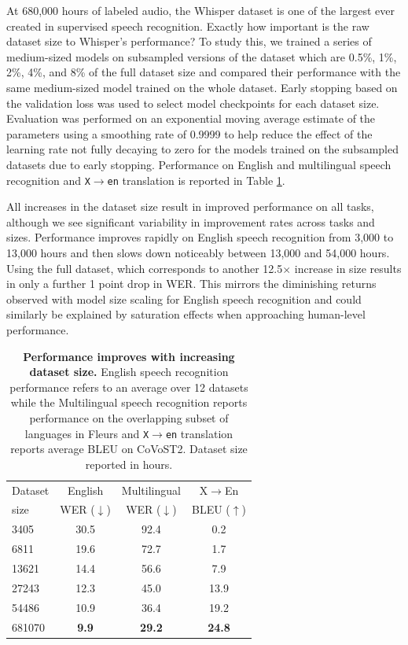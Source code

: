 \documentclass[nohyperref]{article}
\theoremstyle{plain}
\theoremstyle{definition}
\theoremstyle{remark}
\begin{document}
At 680,000 hours of labeled audio, the Whisper dataset is one of the largest ever created in supervised speech recognition. Exactly how important is the raw dataset size to Whisper's performance? To study this, we trained a series of medium-sized models on subsampled versions of the dataset which are 0.5\%, 1\%, 2\%, 4\%, and 8\% of the full dataset size and compared their performance with the same medium-sized model trained on the whole dataset. Early stopping based on the validation loss was used to select model checkpoints for each dataset size. Evaluation was performed on an exponential moving average estimate of the parameters \cite{polyak1992acceleration} using a smoothing rate of 0.9999 to help reduce the effect of the learning rate not fully decaying to zero for the models trained on the subsampled datasets due to early stopping. Performance on English and multilingual speech recognition and \texttt{X$\rightarrow$en} translation is reported in Table \ref{dataset_scaling_table}.

All increases in the dataset size result in improved performance on all tasks, although we see significant variability in improvement rates across tasks and sizes. Performance improves rapidly on English speech recognition from 3,000 to 13,000 hours and then slows down noticeably between 13,000 and 54,000 hours. Using the full dataset, which corresponds to another 12.5$\times$ increase in size results in only a further 1 point drop in WER. This mirrors the diminishing returns observed with model size scaling for English speech recognition and could similarly be explained by saturation effects when approaching human-level performance.

\begin{table}[t]
\vskip 0.15in
\begin{center}
\begin{tabular}{l|ccc}
\toprule
 Dataset & English & Multilingual & X$\rightarrow$En \\
 size & WER ($\downarrow$) & WER ($\downarrow$) & BLEU ($\uparrow$) \\
\midrule
3405 & 30.5 & 92.4 & 0.2 \\
6811 & 19.6 & 72.7 & 1.7 \\
13621 & 14.4 & 56.6 & 7.9 \\
27243 & 12.3 & 45.0 & 13.9 \\
54486 & 10.9 & 36.4 & 19.2 \\
681070 & \textbf{9.9} & \textbf{29.2} & \textbf{24.8} \\
\bottomrule
\end{tabular}
\caption{\textbf{Performance improves with increasing dataset size. } English speech recognition performance refers to an average over 12 datasets while the Multilingual speech recognition reports performance on the overlapping subset of languages in Fleurs and \texttt{X$\rightarrow$en} translation reports average BLEU on CoVoST2. Dataset size reported in hours.}
\label{dataset_scaling_table}
\end{center}
\vspace{-1em}
\end{table}
\end{document}
